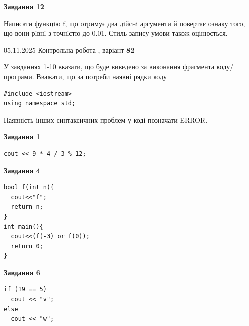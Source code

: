 \documentclass[12pt, ukrainian]{article}
\begin{document}
{\begin {large}
\begin{minipage}[t]{11.0cm}
\begin{center}
\textbf{Завдання 12}
\end{center}

Написати функцiю f, що отримує два дiйснi аргументи й повертає ознаку того, що вони рiвнi з точнiстю до 0.01. Стиль запису умови також оцінюється.\par

\end{minipage}

\end {large}}
\newpage

{\Large{05.11.2025 Контрольна робота , варіант  \No \textbf { 82 }\par}}
{
\begin {large}
У завданнях 1-10 вказати, що буде виведено за виконання фрагмента коду/про\-гра\-ми.
Вважати, що за потреби наявні рядки коду
\begin{verbatim}
#include <iostream>
using namespace std;
\end{verbatim}
Наявність інших синтаксичних проблем у коді позначати ERROR.

\begin{minipage}[t]{7.0cm}

\begin{center}
\textbf{Завдання 1}
\end{center}
\vspace{-8mm}

\begin{verbatim}
cout << 9 * 4 / 3 % 12;
\end{verbatim}



\begin{center}
\textbf{Завдання 4}
\end{center}
\vspace{-8mm}

\begin{verbatim}
bool f(int n){
  cout<<"f";
  return n;
}
int main(){
  cout<<(f(-3) or f(0));
  return 0;
}
\end{verbatim}



\begin{center}
\textbf{Завдання 6}
\end{center}
\vspace{-8mm}

\begin{verbatim}
if (19 == 5)
  cout << "v";
else
  cout << "w";
\end{verbatim}




\end{minipage}
\end{large}}
\end{document}
